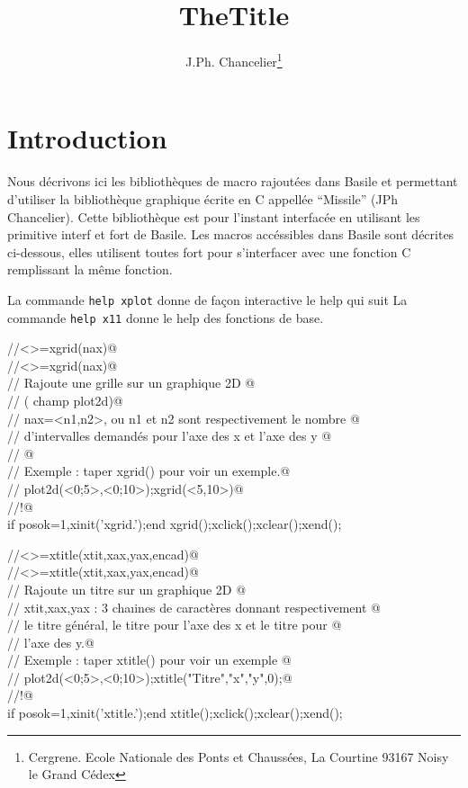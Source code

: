              \textheight=660pt 
             \textwidth=15cm
             \topmargin=-27pt 
             \oddsidemargin=0.7cm
             \evensidemargin=0.7cm
             \marginparwidth=60pt
             \title{TheTitle} 
             \author{J.Ph. Chancelier\thanks{Cergrene. Ecole Nationale des Ponts et Chauss\'ees, La Courtine  93167 Noisy le Grand C\'{e}dex }}
 
\maketitle
\section{Introduction}
Nous d\'ecrivons ici les biblioth\`eques de macro rajout\'ees dans Basile 
et permettant d'utiliser la biblioth\`eque graphique \'ecrite en C 
appell\'ee ``Missile'' (JPh Chancelier). Cette biblioth\`eque est pour l'instant 
 interfac\'ee en utilisant les primitive interf et fort de Basile. 
Les macros acc\'essibles dans Basile sont d\'ecrites ci-dessous, elles 
 utilisent toutes fort pour s'interfacer avec une fonction C remplissant la m\^eme fonction.

La commande \verb+help xplot+ donne de fa\c{c}on interactive  le help qui suit 
La commande \verb+help x11+ donne le help des fonctions de base.

\verb@//<>=xgrid(nax)@ \\
\verb@//<>=xgrid(nax)@ \\
\verb@// Rajoute une grille sur un graphique 2D @ \\
\verb@//  ( champ plot2d)@ \\
\verb@// nax=<n1,n2>, ou n1 et n2 sont respectivement le nombre @ \\
\verb@// d'intervalles demand\'es pour l'axe des x et l'axe des y @ \\
\verb@// @ \\
\verb@// Exemple : taper xgrid() pour voir un exemple.@ \\
\verb@//           plot2d(<0;5>,<0;10>);xgrid(<5,10>)@ \\
\verb@//!@ \\
if posok=1,xinit('xgrid.');end
xgrid();xclick();xclear();xend();


\verb@//<>=xtitle(xtit,xax,yax,encad)@ \\
\verb@//<>=xtitle(xtit,xax,yax,encad)@ \\
\verb@// Rajoute un titre sur un graphique 2D @ \\
\verb@// xtit,xax,yax : 3 cha\i{i}nes de caract\`eres donnant respectivement @ \\
\verb@// le titre g\'en\'eral, le titre pour l'axe des x et le titre pour @ \\
\verb@// l'axe des y.@ \\
\verb@// Exemple : taper xtitle() pour voir un exemple @ \\
\verb@//         plot2d(<0;5>,<0;10>);xtitle("Titre","x","y",0);@ \\
\verb@//!@ \\
if posok=1,xinit('xtitle.');end
xtitle();xclick();xclear();xend();

